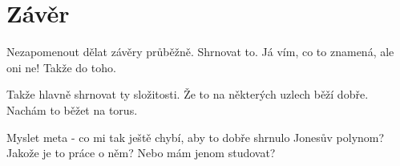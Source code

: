 \chapter*{Závěr}

Nezapomenout dělat závěry průběžně. Shrnovat to. Já vím, co to znamená, ale oni ne! Takže do toho.

Takže hlavně shrnovat ty složitosti. Že to na některých uzlech běží dobře. Nachám to běžet na torus.

Myslet meta - co mi tak ještě chybí, aby to dobře shrnulo Jonesův polynom?
Jakože je to práce o něm? Nebo mám jenom studovat?